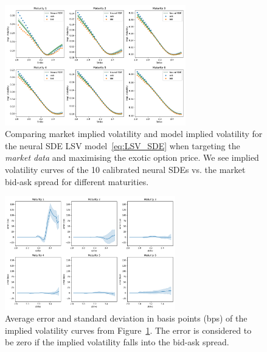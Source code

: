 \begin{figure}[H]
  \centering 
	\includegraphics[clip, width=0.7\textwidth]{content/reschap1/Figures/figures_SPX/iv_nsde_upper_bound.pdf}
  \caption{Comparing market implied volatility and model implied volatility for the neural SDE LSV model~\eqref{eq:LSV_SDE} when targeting the {\em market data} and maximising the exotic option price.
We see implied volatility curves of the 10 calibrated neural SDEs vs. the market bid-ask spread for different maturities.
}
\label{fig:SPX LSV calibration iv upper bound exotic}  
\end{figure}


\begin{figure}[H]
  \centering 
	\includegraphics[clip, width=0.66\textwidth]{content/reschap1/Figures/figures_SPX/iv_error_upper_bound.pdf}
  \caption{Average error and standard deviation in basis points (bps) of the implied volatility curves from Figure~\ref{fig:SPX LSV calibration iv upper bound exotic}. The error is considered to be zero if the implied volatility falls into the bid-ask spread. 
}
\label{fig:SPX LSV calibration iv error upper bound exotic}  
\end{figure}



